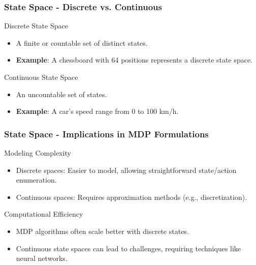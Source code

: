 \documentclass[aspectratio=169]{beamer}
\begin{document}
\begin{frame}[fragile]
    \frametitle{State Space - Discrete vs. Continuous}
    \begin{block}{Discrete State Space}
        \begin{itemize}
            \item A finite or countable set of distinct states.
            \item \textbf{Example}: A chessboard with 64 positions represents a discrete state space.
        \end{itemize}
    \end{block}
    
    \begin{block}{Continuous State Space}
        \begin{itemize}
            \item An uncountable set of states.
            \item \textbf{Example}: A car's speed range from 0 to 100 km/h.
        \end{itemize}
    \end{block}
\end{frame}

\begin{frame}[fragile]
    \frametitle{State Space - Implications in MDP Formulations}
    \begin{block}{Modeling Complexity}
        \begin{itemize}
            \item Discrete spaces: Easier to model, allowing straightforward state/action enumeration.
            \item Continuous spaces: Requires approximation methods (e.g., discretization).
        \end{itemize}
    \end{block}

    \begin{block}{Computational Efficiency}
        \begin{itemize}
            \item MDP algorithms often scale better with discrete states.
            \item Continuous state spaces can lead to challenges, requiring techniques like neural networks.
        \end{itemize}
    \end{block}
\end{frame}
\end{document}
